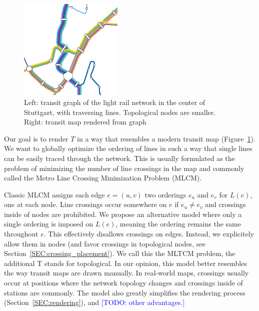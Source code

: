 \documentclass{llncs}
\newcommand\todo[1]{\textcolor{blue}{[TODO: #1]}}
\begin{document}
\begin{figure}
  \centering
	
	\hspace{.5cm}
    \includegraphics[trim={0cm 0 2.47cm 4.22cm},clip,width=0.44\textwidth]{render_examples/vvs_cropped.pdf}
	\caption{Left: transit graph of the light rail network in the center of Stuttgart, with traversing lines. Topological nodes are smaller. Right: transit map rendered from graph}
	\label{FIG:transitgraphvvs}
\end{figure}

Our goal is to render $T$ in a way that resembles a modern transit map (Figure~\ref{FIG:transitgraphvvs}). We want to globally optimize the ordering of lines in such a way that single lines can be easily traced through the network. This is usually formulated as the problem of minimizing the number of line crossings in the map and commonly called the Metro Line Crossing Minimization Problem (MLCM).

Classic MLCM assigns each edge $e=(u, v)$ two orderings $e_{u}$ and $e_{v}$ for $L(e)$, one at each node. Line crossings occur somewhere on $e$ if $e_{u} \neq e_{v}$ and crossings inside of nodes are prohibited. We propose an alternative model where only a single ordering is imposed on $L(e)$, meaning the ordering remains the same throughout $e$. This effectively disallows crossings on edges. Instead, we explicitely allow them in nodes (and favor crossings in topological nodes, see Section~\ref{SEC:crossing_placement}). We call this the MLTCM problem, the additional T stands for topological. In our opinion, this model better resembles the way transit maps are drawn manually. In real-world maps, crossings usually occur at positions where the network topology changes and crossings inside of stations are commonly. The model also greatly simplifies the rendering process (Section~\ref{SEC:rendering}), and \todo{other advantages.}
\end{document}
